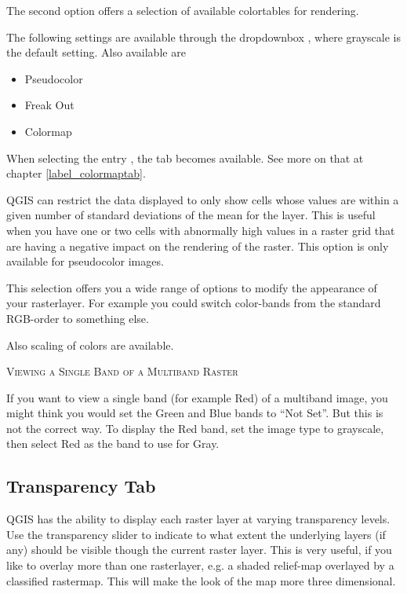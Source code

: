 The second option offers a selection of available colortables for rendering.

The following settings are available through the dropdownbox
, where grayscale is the default
setting.
Also available are
\begin{itemize}[label=--]
\item Pseudocolor
\item Freak Out
\item Colormap
\end{itemize}

When selecting the entry , the tab
 becomes available. See more on that at chapter
\ref{label_colormaptab}.

QGIS can restrict the data displayed to only show cells whose values are
within a given number of standard deviations of the mean for the
layer. This is useful when you have one or
two cells with abnormally high values in a raster grid that are having a
negative impact on the rendering of the raster. This option is only available
for pseudocolor images.


This selection offers you a wide range of options to modify the appearance
of your rasterlayer. For example you could switch color-bands from the
standard RGB-order to something else.

Also scaling of colors are available.


\begin{Tip}\caption{\textsc{Viewing a Single Band of a Multiband Raster}}
If you want to view a single band (for example Red) of a multiband
image, you might think you would set the Green and Blue bands to ``Not
Set''. But this is not the correct way. To display the Red band,
set the image type to grayscale, then select Red as the band to use for Gray.
\end{Tip}

\subsection{Transparency Tab} \label{rastertab:transparency}

QGIS has the ability to display each raster layer at varying transparency
levels. Use the transparency slider to indicate to
what extent the underlying layers (if any) should be visible though the
current raster layer.
This is very useful, if
you like to overlay more than one rasterlayer, e.g. a shaded relief-map
overlayed by a classified rastermap. This will make the look of the map
more three dimensional.

